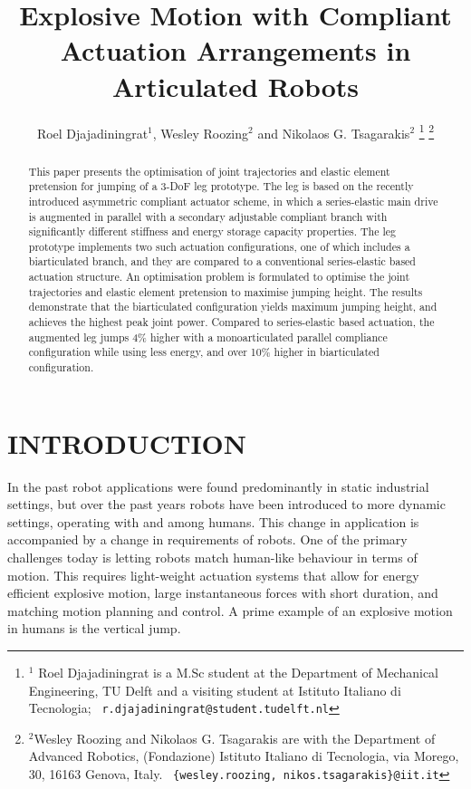 \documentclass[letterpaper, 10 pt, conference]{ieeeconf}  %
\title{\LARGE \bf
	Explosive Motion with Compliant Actuation Arrangements in Articulated Robots
}
\author{Roel Djajadiningrat$^{1}$, Wesley Roozing$^{2}$ and Nikolaos G. Tsagarakis$^{2}$%
	\thanks{$^{1}$ Roel Djajadiningrat is a M.Sc student at the Department of Mechanical Engineering, TU Delft and a visiting student at Istituto Italiano di Tecnologia;
		{\tt\ r.djajadiningrat@student.tudelft.nl}
	}%
	\thanks{$^{2}$Wesley Roozing and Nikolaos G. Tsagarakis are with the Department of Advanced Robotics,
		(Fondazione) Istituto Italiano di Tecnologia, via Morego,
		30, 16163 Genova, Italy.
		{\tt\ \{wesley.roozing, nikos.tsagarakis\}@iit.it}
	}%
}
\begin{document}
\maketitle
\thispagestyle{empty}
\pagestyle{empty}


\begin{abstract}

This paper presents the optimisation of joint trajectories and elastic element pretension for jumping of a 3-DoF leg prototype. The leg is based on the recently introduced asymmetric compliant actuator scheme, in which a series-elastic main drive is augmented in parallel with a secondary adjustable compliant branch with significantly different stiffness and energy storage capacity properties. The leg prototype implements two such actuation configurations, one of which includes a biarticulated branch, and they are compared to a conventional series-elastic based actuation structure. An optimisation problem is formulated to optimise the joint trajectories and elastic element pretension to maximise jumping height. The results demonstrate that the biarticulated configuration yields maximum jumping height, and achieves the highest peak joint power. Compared to series-elastic based actuation, the augmented leg jumps 4\% higher with a monoarticulated parallel compliance configuration while using less energy, and over 10\% higher in biarticulated configuration.

\end{abstract}


\section{INTRODUCTION}
In the past robot applications were found predominantly in static industrial settings, but over the past years robots have been introduced to more dynamic settings, operating with and among humans. This change in application is accompanied by a change in requirements of robots. One of the primary challenges today is letting robots match human-like behaviour in terms of motion. This requires light-weight actuation systems that allow for energy efficient explosive motion, large instantaneous forces with short duration, and matching motion planning and control. A prime example of an explosive motion in humans is the vertical jump.
\end{document}
